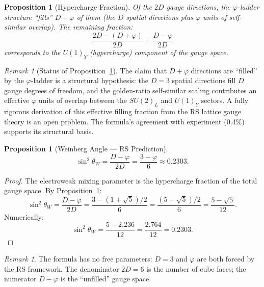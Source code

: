 \documentclass[12pt,a4paper]{article}
\newtheorem{proposition}[theorem]{Proposition}
\theoremstyle{definition}
\theoremstyle{remark}
\newtheorem{remark}[theorem]{Remark}
\begin{document}
\begin{proposition}[Hypercharge Fraction]
\label{prop:hyper}
Of the $2D$ gauge directions, the $\varphi$-ladder structure
``fills'' $D + \varphi$ of them (the $D$ spatial directions
plus $\varphi$ units of self-similar overlap).  The remaining
fraction:
\begin{equation}
  \frac{2D - (D + \varphi)}{2D} = \frac{D - \varphi}{2D}
\end{equation}
corresponds to the $U(1)_Y$ (hypercharge) component of the
gauge space.
\end{proposition}

\begin{remark}[Status of Proposition~\ref{prop:hyper}]
The claim that $D + \varphi$ directions are ``filled'' by the
$\varphi$-ladder is a structural hypothesis: the $D = 3$ spatial
directions fill $D$ gauge degrees of freedom, and the golden-ratio
self-similar scaling contributes an effective $\varphi$ units of
overlap between the $SU(2)_L$ and $U(1)_Y$ sectors.  A fully
rigorous derivation of this effective filling fraction from the
RS lattice gauge theory is an open problem.  The formula's agreement
with experiment ($0.4\%$) supports its structural basis.
\end{remark}

\begin{proposition}[Weinberg Angle --- RS Prediction]
\label{thm:weinberg}
\begin{equation}
  \boxed{\sin^2\theta_W = \frac{D - \varphi}{2D}
  = \frac{3 - \varphi}{6} \approx 0.2303.}
\end{equation}
\end{proposition}

\begin{proof}
The electroweak mixing parameter is the hypercharge fraction of
the total gauge space.  By Proposition~\ref{prop:hyper}:
\begin{equation}
  \sin^2\theta_W = \frac{D - \varphi}{2D}
  = \frac{3 - (1+\sqrt{5})/2}{6}
  = \frac{(5 - \sqrt{5})/2}{6}
  = \frac{5 - \sqrt{5}}{12}.
\end{equation}
Numerically:
\begin{equation}
  \sin^2\theta_W = \frac{5 - 2.236}{12}
  = \frac{2.764}{12} = 0.2303.
\end{equation}
\end{proof}

\begin{remark}
The formula has no free parameters: $D = 3$ and $\varphi$ are
both forced by the RS framework.  The denominator $2D = 6$ is
the number of cube faces; the numerator $D - \varphi$ is the
``unfilled'' gauge space.
\end{remark}
\end{document}
